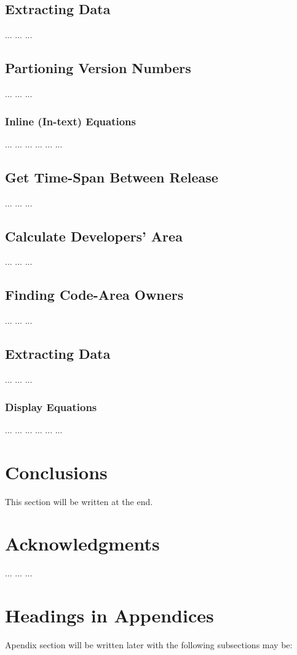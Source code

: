 \documentclass{acm_proc_article-sp}
\begin{document}
\subsection{Extracting Data}
... ... ...

\subsection{Partioning Version Numbers}
... ... ...
\subsubsection{Inline (In-text) Equations}
... ... ... ... ... ... 

\subsection{Get Time-Span Between Release}
... ... ...

\subsection{Calculate Developers' Area}
... ... ...

\subsection{Finding Code-Area Owners}
... ... ...

\subsection{Extracting Data}
... ... ...
\subsubsection{Display Equations}
... ... ... ... ... ...

\section{Conclusions}
This section will be written at the end.

\section{Acknowledgments}
... ... ...

 
\appendix
\section{Headings in Appendices}
Apendix section will be written later with the following subsections may be:
\end{document}

